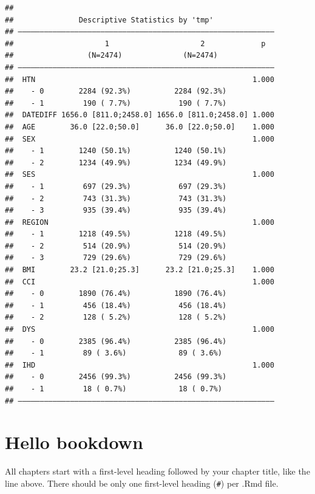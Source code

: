 \documentclass[
]{book}
\theoremstyle{definition}
\theoremstyle{definition}
\theoremstyle{definition}
\theoremstyle{definition}
\theoremstyle{remark}
\begin{document}
\begin{verbatim}
## 
##               Descriptive Statistics by 'tmp'             
## ——————————————————————————————————————————————————————————— 
##                     1                     2             p  
##                 (N=2474)              (N=2474)       
## ——————————————————————————————————————————————————————————— 
##  HTN                                                  1.000
##    - 0        2284 (92.3%)          2284 (92.3%)           
##    - 1         190 ( 7.7%)           190 ( 7.7%)           
##  DATEDIFF 1656.0 [811.0;2458.0] 1656.0 [811.0;2458.0] 1.000
##  AGE        36.0 [22.0;50.0]      36.0 [22.0;50.0]    1.000
##  SEX                                                  1.000
##    - 1        1240 (50.1%)          1240 (50.1%)           
##    - 2        1234 (49.9%)          1234 (49.9%)           
##  SES                                                  1.000
##    - 1         697 (29.3%)           697 (29.3%)           
##    - 2         743 (31.3%)           743 (31.3%)           
##    - 3         935 (39.4%)           935 (39.4%)           
##  REGION                                               1.000
##    - 1        1218 (49.5%)          1218 (49.5%)           
##    - 2         514 (20.9%)           514 (20.9%)           
##    - 3         729 (29.6%)           729 (29.6%)           
##  BMI        23.2 [21.0;25.3]      23.2 [21.0;25.3]    1.000
##  CCI                                                  1.000
##    - 0        1890 (76.4%)          1890 (76.4%)           
##    - 1         456 (18.4%)           456 (18.4%)           
##    - 2         128 ( 5.2%)           128 ( 5.2%)           
##  DYS                                                  1.000
##    - 0        2385 (96.4%)          2385 (96.4%)           
##    - 1         89 ( 3.6%)            89 ( 3.6%)            
##  IHD                                                  1.000
##    - 0        2456 (99.3%)          2456 (99.3%)           
##    - 1         18 ( 0.7%)            18 ( 0.7%)            
## ———————————————————————————————————————————————————————————
\end{verbatim}

\hypertarget{hello-bookdown}{%
\chapter{Hello bookdown}\label{hello-bookdown}}

All chapters start with a first-level heading followed by your chapter title, like the line above. There should be only one first-level heading (\texttt{\#}) per .Rmd file.
\end{document}
